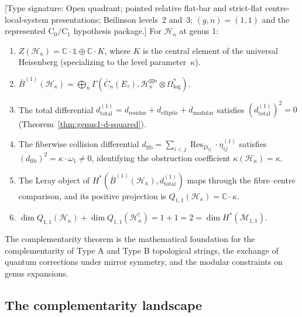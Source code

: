 \begin{example}
\textup{[Type signature: Open quadrant; pointed relative flat-bar and
strict-flat centre-local-system presentations; Beilinson levels~2
and~3; \((g,n)=(1,1)\) and the represented
\(\mathrm C_0/\mathrm C_1\) hypothesis package.]}
For $\mathcal{H}_\kappa$ at genus 1:
\begin{enumerate}
\item $Z(\mathcal{H}_\kappa) = \mathbb{C} \cdot \mathbb{1} \oplus \mathbb{C} \cdot
K$, where $K$ is the central element of the universal Heisenberg
(specializing to the level parameter~$\kappa$).
\item $\bar{B}^{(1)}(\mathcal{H}_\kappa) = \bigoplus_n \Gamma(\overline{C}_n(E_\tau),
\mathcal{H}_\kappa^{\boxtimes n} \otimes \Omega^*_{\log})$.
\item The total differential $d^{(1)}_{\mathrm{total}} = d_{\mathrm{residue}} +
d_{\mathrm{elliptic}} + d_{\mathrm{modular}}$ satisfies
$(d^{(1)}_{\mathrm{total}})^2 = 0$
(Theorem~\ref{thm:genus1-d-squared}).
\item The fiberwise collision differential
$d_{\mathrm{fib}} = \sum_{i<j} \operatorname{Res}_{D_{ij}} \cdot \eta_{ij}^{(1)}$ satisfies
$(d_{\mathrm{fib}})^2 = \kappa \cdot \omega_1 \neq 0$,
identifying the obstruction coefficient $\kappa(\mathcal{H}_\kappa) = \kappa$.
\item The Leray object of
$H^*(\bar B^{(1)}(\mathcal H_\kappa),d^{(1)}_{\mathrm{total}})$
maps through the fibre--centre comparison, and its positive projection
is $Q_{1,1}(\mathcal H_\kappa)=\mathbb C\cdot\kappa$.
\item $\dim Q_{1,1}(\mathcal{H}_\kappa) + \dim Q_{1,1}(\mathcal{H}_\kappa^!) = 1 + 1 = 2 =
\dim H^*(\overline{\mathcal{M}}_{1,1})$.
\end{enumerate}
\end{example}


\begin{remark}
\label{rem:string-theory-complementarity}
The complementarity theorem is the mathematical foundation for the
complementarity of Type A and Type B topological strings, the
exchange of quantum corrections under mirror symmetry, and the
modular constraints on genus expansions.
\end{remark}

\subsection{The complementarity landscape}
\label{subsec:complementarity-landscape}

